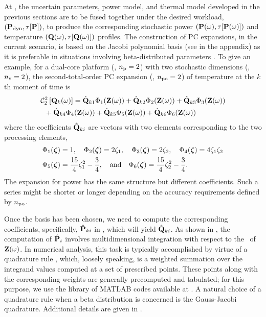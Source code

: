 At , the uncertain parameters, power model, and thermal model developed in the previous sections are to be fused together under the desired workload, $\profilePdyn$, to produce the corresponding stochastic power $\profileP{\o}$ and temperature $\profileT{\o}$ profiles.
The construction of PC expansions, in the current scenario, is based on the Jacobi polynomial basis (see  in the appendix) as it is preferable in situations involving beta-distributed parameters \cite{xiu2010}.
To give an example, for a dual-core platform (\ie, ${n_\text{p}} = 2$) with two stochastic dimensions (\ie, ${n_\text{v}} = 2$), the second-total-order PC expansion (\ie, ${n_\text{po}} = 2$) of temperature at the $k$th moment of time is
\begin{align}
  & \oPC{2}{2}{\vTO_k(\o)} = \pcc{\vTO}_{k1} \pcb_1(\vZ(\o)) + \pcc{\vTO}_{k2} \pcb_2(\vZ(\o)) + \pcc{\vTO}_{k3} \pcb_3(\vZ(\o)) \nonumber \\
  & {} \; \; + \pcc{\vTO}_{k4} \pcb_4(\vZ(\o)) + \pcc{\vTO}_{k5} \pcb_5(\vZ(\o)) + \pcc{\vTO}_{k6} \pcb_6(\vZ(\o)) \elabel{pc-example}
\end{align}
where the coefficients $\hat{\mathbf{Q}}_{ki}$ are vectors with two elements corresponding to the two processing elements,
\begin{align*}
  & \Phi_1(\boldsymbol{\zeta}) = 1, \hspace{1em} \Phi_2(\boldsymbol{\zeta}) = 2 \zeta_1, \hspace{1em} \Phi_3(\boldsymbol{\zeta}) = 2 \zeta_2, \hspace{1em} \Phi_4(\boldsymbol{\zeta}) = 4 \zeta_1 \zeta_2 \\
  & \Phi_5(\boldsymbol{\zeta}) = \frac{15}{4} \zeta_1^2 - \frac{3}{4}, \hspace{1em} \text{and} \hspace{1em} \Phi_6(\boldsymbol{\zeta}) = \frac{15}{4} \zeta_2^2 - \frac{3}{4}.
\end{align*}
The expansion for power has the same structure but different coefficients.
Such a series might be shorter or longer depending on the accuracy requirements defined by ${n_\text{po}}$.

Once the basis has been chosen, we need to compute the corresponding coefficients, specifically, $\hat{\mathbf{P}}_{ki}$ in , which will yield $\hat{\mathbf{Q}}_{ki}$.
As shown in , the computation of $\hat{\mathbf{P}}_i$ involves multidimensional integration with respect to the \pdf\ of $\mathbf{Z}(\omega)$.
In numerical analysis, this task is typically accomplished by virtue of a quadrature rule \cite{press2007}, which, loosely speaking, is a weighted summation over the integrand values computed at a set of prescribed points.
These points along with the corresponding weights are generally precomputed and tabulated; for this purpose, we use the library of MATLAB codes available at \cite{burkardt2013}.
A natural choice of a quadrature rule when a beta distribution is concerned is the Gauss-Jacobi quadrature.
Additional details are given in .

